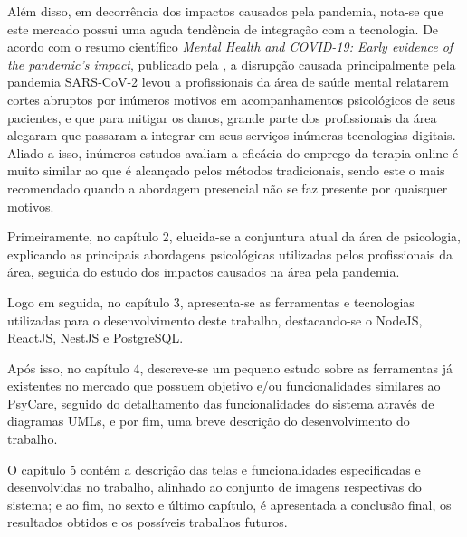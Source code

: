 Além disso, em decorrência dos impactos causados pela pandemia, nota-se que este mercado possui uma aguda tendência de integração com a tecnologia. De acordo com o resumo científico \textit{Mental Health and COVID-19: Early evidence of the pandemic’s impact}, publicado pela , a disrupção causada principalmente pela pandemia SARS-CoV-2 levou a profissionais da área de saúde mental relatarem cortes abruptos por inúmeros motivos em acompanhamentos psicológicos de seus pacientes, e que para mitigar os danos, grande parte dos profissionais da área alegaram que passaram a integrar em seus serviços inúmeras tecnologias digitais. Aliado a isso, inúmeros estudos avaliam a eficácia do emprego da terapia online é muito similar ao que é alcançado pelos métodos tradicionais, sendo este o mais recomendado quando a abordagem presencial não se faz presente por quaisquer motivos.

Primeiramente, no capítulo 2, elucida-se a conjuntura atual da área de psicologia, explicando as principais abordagens psicológicas utilizadas pelos profissionais da área, seguida do estudo dos impactos causados na área pela pandemia.

Logo em seguida, no capítulo 3, apresenta-se as ferramentas e tecnologias utilizadas para o desenvolvimento deste trabalho, destacando-se o NodeJS, ReactJS, NestJS e PostgreSQL.

Após isso, no capítulo 4, descreve-se um pequeno estudo sobre as ferramentas já existentes no mercado que possuem objetivo e/ou funcionalidades similares ao PsyCare, seguido do detalhamento das funcionalidades do sistema através de diagramas UMLs, e por fim, uma breve descrição do desenvolvimento do trabalho.

O capítulo 5 contém a descrição das telas e funcionalidades especificadas e desenvolvidas no trabalho, alinhado ao conjunto de imagens respectivas do sistema; e ao fim, no sexto e último capítulo, é apresentada a conclusão final, os resultados obtidos e os possíveis trabalhos futuros.
